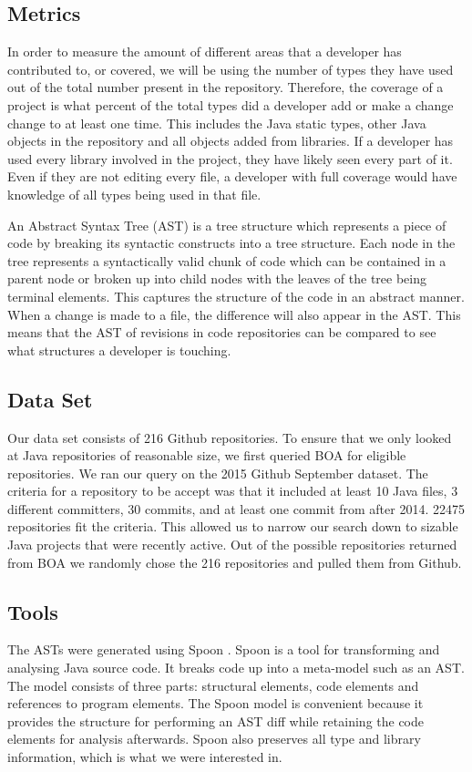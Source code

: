 \documentclass{sig-alternate-05-2015}
\begin{document}
\subsection{Metrics}
In order to measure the amount of different areas that a developer has contributed to, or covered, we will be using the number of types they have used out of the total number present in the repository. Therefore, the coverage of a project is what percent of the total types did a developer add or make a change change to at least one time. This includes the Java static types, other Java objects in the repository and all objects added from libraries. If a developer has used every library involved in the project, they have likely seen every part of it. Even if they are not editing every file, a developer with full coverage would have knowledge of all types being used in that file. 

An Abstract Syntax Tree (AST) is a tree structure which represents a piece of code by breaking its syntactic constructs into a tree structure. Each node in the tree represents a syntactically valid chunk of code which can be contained in a parent node or broken up into child nodes with the leaves of the tree being terminal elements. This captures the structure of the code in an abstract manner. When a change is made to a file, the difference will also appear in the AST. This means that the AST of revisions in code repositories can be compared to see what structures a developer is touching. 

\subsection{Data Set}
Our data set consists of 216 Github repositories. To ensure that we only looked at Java repositories of reasonable size, we first queried BOA \cite{Dyer-Nguyen-Rajan-Nguyen-13} for eligible repositories. We ran our query on the 2015 Github September dataset. The criteria for a repository to be accept was that it included at least 10 Java files, 3 different committers, 30 commits, and at least one commit from after 2014. 22475 repositories fit the criteria. This allowed us to narrow our search down to sizable Java projects that were recently active. Out of the possible repositories returned from BOA we randomly chose the 216 repositories and pulled them from Github.

\subsection{Tools}
The ASTs were generated using Spoon \cite{pawlak:hal-01169705}. Spoon is a tool for transforming and analysing Java source code. It breaks code up into a meta-model such as an AST. The model consists of three parts: structural elements, code elements and references to program elements. The Spoon model is convenient because it provides the structure for performing an AST diff while retaining the code elements for analysis afterwards. Spoon also preserves all type and library information, which is what we were interested in.
\end{document}
